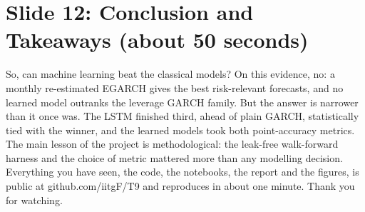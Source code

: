 \documentclass[a4paper,11pt]{article}
\begin{document}
\section*{Slide 12: Conclusion and Takeaways (about 50 seconds)}

So, can machine learning beat the classical models? On this evidence, no: a monthly re-estimated EGARCH gives the best risk-relevant forecasts, and no learned model outranks the leverage GARCH family. But the answer is narrower than it once was. The LSTM finished third, ahead of plain GARCH, statistically tied with the winner, and the learned models took both point-accuracy metrics. The main lesson of the project is methodological: the leak-free walk-forward harness and the choice of metric mattered more than any modelling decision. Everything you have seen, the code, the notebooks, the report and the figures, is public at github.com/iitgF/T9 and reproduces in about one minute. Thank you for watching.
\end{document}
